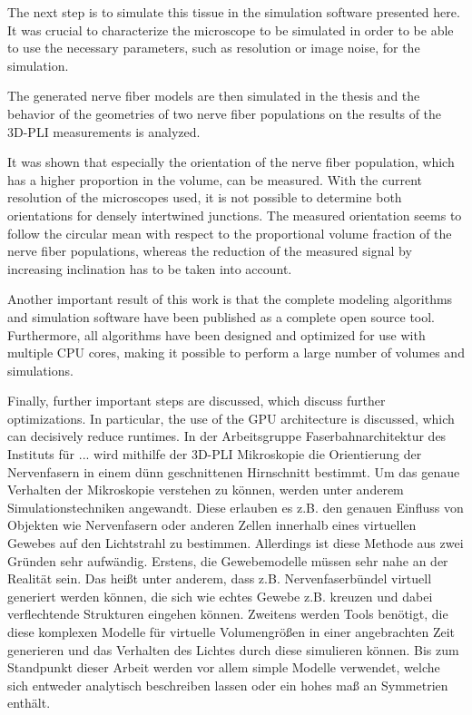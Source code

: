 The next step is to simulate this tissue in the simulation software presented here.
It was crucial to characterize the microscope to be simulated in order to be able to use the necessary parameters, such as resolution or image noise, for the simulation.

The generated nerve fiber models are then simulated in the thesis and the behavior of the geometries of two nerve fiber populations on the results of the 3D-PLI measurements is analyzed.

It was shown that especially the orientation of the nerve fiber population, which has a higher proportion in the volume, can be measured.
With the current resolution of the microscopes used, it is not possible to determine both orientations for densely intertwined junctions.
The measured orientation seems to follow the circular mean with respect to the proportional volume fraction of the nerve fiber populations, whereas the reduction of the measured signal by increasing inclination has to be taken into account.

Another important result of this work is that the complete modeling algorithms and simulation software have been published as a complete open source tool.
Furthermore, all algorithms have been designed and optimized for use with multiple CPU cores, making it possible to perform a large number of volumes and simulations.

Finally, further important steps are discussed, which discuss further optimizations.
In particular, the use of the GPU architecture is discussed, which can decisively reduce runtimes.
% 
% 
% 
% 
In der Arbeitsgruppe Faserbahnarchitektur des Instituts für ... wird mithilfe der 3D-PLI Mikroskopie die Orientierung der Nervenfasern in einem dünn geschnittenen Hirnschnitt bestimmt.
Um das genaue Verhalten der Mikroskopie verstehen zu können, werden unter anderem Simulationstechniken angewandt.
Diese erlauben es z.B. den genauen Einfluss von Objekten wie Nervenfasern oder anderen Zellen innerhalb eines virtuellen Gewebes auf den Lichtstrahl zu bestimmen.
Allerdings ist diese Methode aus zwei Gründen sehr aufwändig.
Erstens, die Gewebemodelle müssen sehr nahe an der Realität sein.
Das heißt unter anderem, dass z.B. Nervenfaserbündel virtuell generiert werden können, die sich wie echtes Gewebe z.B. kreuzen und dabei verflechtende Strukturen eingehen können.
Zweitens werden Tools benötigt, die diese komplexen Modelle für virtuelle Volumengrößen in einer angebrachten Zeit generieren und das Verhalten des Lichtes durch diese simulieren können.
Bis zum Standpunkt dieser Arbeit werden vor allem simple Modelle verwendet, welche sich entweder analytisch beschreiben lassen oder ein hohes maß an Symmetrien enthält.

